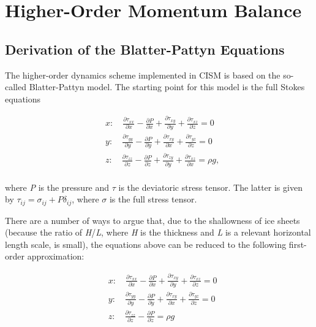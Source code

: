 
\section{Higher-Order Momentum Balance}
\label{sc:higher-order-mom}

\subsection{Derivation of the Blatter-Pattyn Equations}

The higher-order dynamics scheme implemented in CISM is based on the so-called Blatter-Pattyn model. The starting point for this model is the full Stokes equations

\begin{align*}
  & x:\quad \frac{\partial \tau _{xx}}{\partial x}-\frac{\partial P}{\partial x}+\frac{\partial \tau _{xy}}{\partial y}+\frac{\partial \tau _{xz}}{\partial z}=0 \\ 
 & y:\quad \frac{\partial \tau _{yy}}{\partial y}-\frac{\partial P}{\partial y}+\frac{\partial \tau _{xy}}{\partial x}+\frac{\partial \tau _{yz}}{\partial z}=0 \\ 
 & z:\quad \frac{\partial \tau _{zz}}{\partial z}-\frac{\partial P}{\partial z}+\frac{\partial \tau _{zy}}{\partial y}+\frac{\partial \tau _{xz}}{\partial x}=\rho g, \\ 
\end{align*}

where \textit{P} is the pressure and {\large \(\tau{}\)} is the deviatoric stress tensor. The latter is given by $\tau _{ij}=\sigma _{ij}+P\delta _{ij}$, 
where {\large \(\sigma{}\)} is the full stress tensor.

There are a number of ways to argue that, due to the shallowness of ice sheets (because the ratio of \textit{H}/\textit{L}, where \textit{H} is the thickness and \textit{L} is a relevant horizontal length scale, is small), the equations above can be reduced to the following first-order approximation:

\begin{align*}
  & x:\quad \frac{\partial \tau _{xx}}{\partial x}-\frac{\partial P}{\partial x}+\frac{\partial \tau _{xy}}{\partial y}+\frac{\partial \tau _{xz}}{\partial z}=0 \\ 
 & y:\quad \frac{\partial \tau _{yy}}{\partial y}-\frac{\partial P}{\partial y}+\frac{\partial \tau _{xy}}{\partial x}+\frac{\partial \tau _{yz}}{\partial z}=0 \\ 
 & z:\quad \frac{\partial \tau _{zz}}{\partial z}-\frac{\partial P}{\partial z}=\rho g \\ 
\end{align*}

